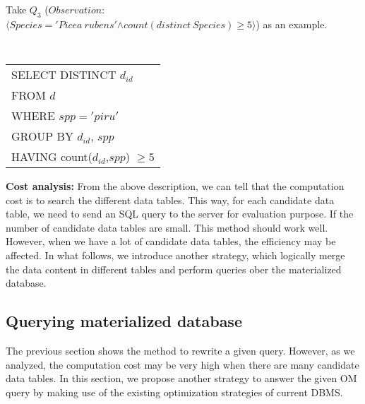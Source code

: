 \begin{example}
Take $Q_3$ ($Observation:$\\
$\langle Species='Picea~rubens'$$\wedge count(distinct~Species)\geq
5\rangle$) as an example. 


\vspace{0.1in}
{\tt 
\begin{tabular}{l} 
SELECT DISTINCT $d_{id}$\\
FROM $d$\\
WHERE $spp = 'piru'$\\
GROUP BY $d_{id}$, $spp$\\
HAVING count($d_{id}$,$spp$) $\geq 5$\\
\end{tabular}
}
\vspace{0.1in}

\end{example}

{\bf Cost analysis:} 
From the above description, we can tell that the computation cost is to search the different data
tables. This way, for each candidate data table, we need to send an
SQL query to the server for evaluation purpose.
If the number of candidate data tables are small. This method should
work well. However, when we have a lot of candidate data tables, the
efficiency may be affected. 
In what follows, we introduce another strategy, which logically merge
the data content in different tables and perform queries ober the
materialized database. 

\subsection{Querying materialized database}\label{sec:matdb}

The previous section shows the method to rewrite a given query. 
However, as we analyzed, the computation cost may be very high when
there are many candidate data tables. 
In this section, we propose another strategy to answer the given OM
query by making use of the existing optimization strategies of
current DBMS. 

